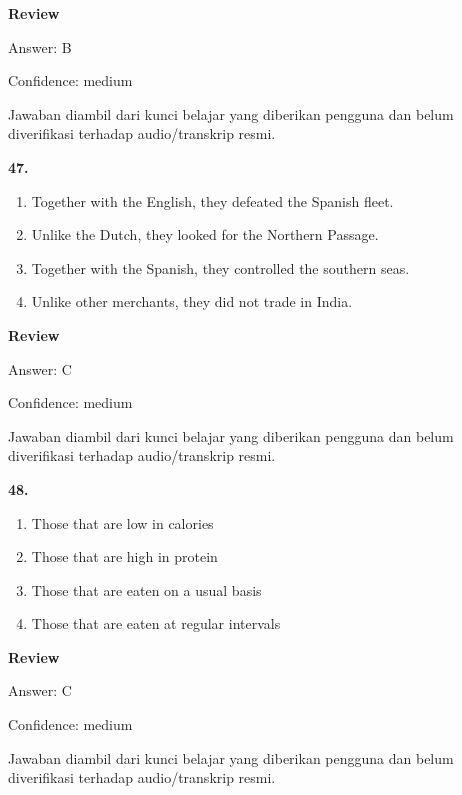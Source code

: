 \documentclass[12pt]{article}
\begin{document}
\par
\begingroup
\setlength{\parskip}{0pt}
\setlength{\parindent}{0pt}
\textbf{Review}\par
Answer: B\par
Confidence: medium\par
Jawaban diambil dari kunci belajar yang diberikan pengguna dan belum diverifikasi terhadap audio/transkrip resmi.\par
\endgroup
\par
\vspace{0.25\baselineskip}
\noindent\textbf{47.}
\begin{enumerate}[label=(\Alph*),leftmargin=*,itemsep=0.2em]
\item Together with the English, they defeated the Spanish fleet.
\item Unlike the Dutch, they looked for the Northern Passage.
\item Together with the Spanish, they controlled the southern seas.
\item Unlike other merchants, they did not trade in India.
\end{enumerate}
\par
\begingroup
\setlength{\parskip}{0pt}
\setlength{\parindent}{0pt}
\textbf{Review}\par
Answer: C\par
Confidence: medium\par
Jawaban diambil dari kunci belajar yang diberikan pengguna dan belum diverifikasi terhadap audio/transkrip resmi.\par
\endgroup
\par
\vspace{0.25\baselineskip}
\noindent\textbf{48.}
\begin{enumerate}[label=(\Alph*),leftmargin=*,itemsep=0.2em]
\item Those that are low in calories
\item Those that are high in protein
\item Those that are eaten on a usual basis
\item Those that are eaten at regular intervals
\end{enumerate}
\par
\begingroup
\setlength{\parskip}{0pt}
\setlength{\parindent}{0pt}
\textbf{Review}\par
Answer: C\par
Confidence: medium\par
Jawaban diambil dari kunci belajar yang diberikan pengguna dan belum diverifikasi terhadap audio/transkrip resmi.\par
\end{document}
